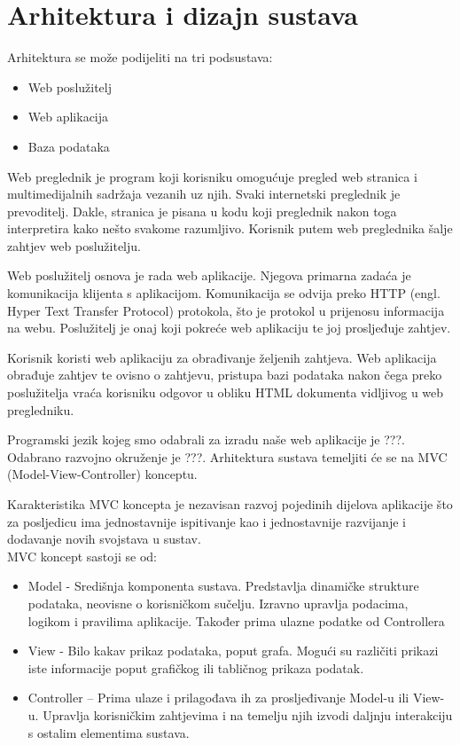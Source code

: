 \chapter{Arhitektura i dizajn sustava}
		
	Arhitektura se može podijeliti na tri podsustava: 
	\begin{itemize}
		\item Web poslužitelj 
		\item Web aplikacija 
		\item Baza podataka 
	\end{itemize}
	Web preglednik je program koji korisniku omogućuje pregled web stranica i multimedijalnih sadržaja vezanih uz njih. Svaki internetski preglednik je prevoditelj. Dakle, stranica je pisana u kodu koji preglednik nakon toga interpretira kako nešto svakome razumljivo. Korisnik putem web preglednika šalje zahtjev web poslužitelju. 
	
	Web poslužitelj osnova je rada web aplikacije. Njegova primarna zadaća je komunikacija klijenta s aplikacijom. Komunikacija se odvija preko HTTP (engl. Hyper Text Transfer Protocol) protokola, što je protokol u prijenosu informacija na webu. Poslužitelj je onaj koji pokreće web aplikaciju te joj prosljeđuje zahtjev. 
	
	Korisnik koristi web aplikaciju za obrađivanje željenih zahtjeva. Web aplikacija obrađuje zahtjev te ovisno o zahtjevu, pristupa bazi podataka nakon čega preko poslužitelja vraća korisniku odgovor u obliku HTML dokumenta vidljivog u web pregledniku. 
	
	Programski jezik kojeg smo odabrali za izradu naše web aplikacije je ???. Odabrano razvojno okruženje je ???. Arhitektura sustava temeljiti će se na MVC (Model-View-Controller) konceptu. 
	
	Karakteristika MVC koncepta je nezavisan razvoj pojedinih dijelova aplikacije što za posljedicu ima jednostavnije ispitivanje kao i jednostavnije razvijanje i dodavanje novih svojstava u sustav. \\
	
	MVC koncept sastoji se od: 
	\begin{itemize}
		\item Model - Središnja komponenta sustava. Predstavlja dinamičke strukture podataka, neovisne o korisničkom sučelju. Izravno upravlja podacima, logikom i pravilima aplikacije. Također prima ulazne podatke od Controllera 
		\item View - Bilo kakav prikaz podataka, poput grafa. Mogući su različiti prikazi iste informacije poput grafičkog ili tabličnog prikaza podatak. 
		\item Controller – Prima ulaze i prilagođava ih za prosljeđivanje Model-u ili View-u. Upravlja korisničkim zahtjevima i na temelju njih izvodi daljnju interakciju s ostalim elementima sustava. 
	\end{itemize}
		

